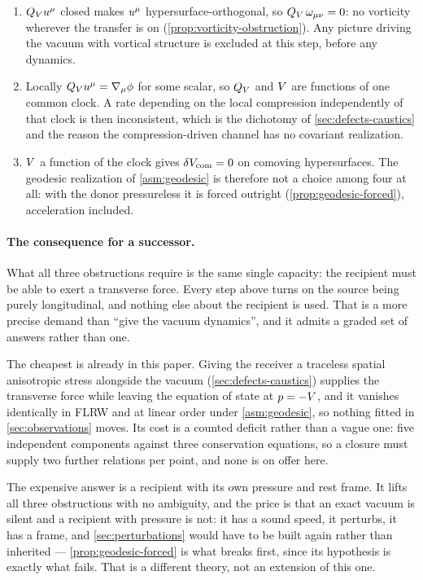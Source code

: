 \begin{enumerate}
  \item $Q_{V}u^{\mu}$ closed makes $u^{\mu}$ hypersurface-orthogonal, so
    $Q_{V}\,\omega_{\mu\nu}=0$: no vorticity wherever the transfer is on
    (\cref{prop:vorticity-obstruction}). Any picture driving the vacuum with
    vortical structure is excluded at this step, before any dynamics.
  \item Locally $Q_{V}u^{\mu}=\nabla_\mu\phi$ for some scalar, so $Q_{V}$ and $V$
    are functions of one common clock. A rate depending on the local
    compression independently of that clock is then inconsistent, which is the
    dichotomy of \cref{sec:defects-caustics} and the reason the
    compression-driven channel has no covariant realization.
  \item $V$ a function of the clock gives $\delta V_{\rm com}=0$ on
    comoving hypersurfaces. The geodesic realization of \cref{asm:geodesic} is
    therefore not a choice among four at all: with the donor pressureless it is
    forced outright (\cref{prop:geodesic-forced}), acceleration included.
\end{enumerate}

\paragraph{The consequence for a successor.} What all three obstructions
require is the same single capacity: the recipient must be able to exert a
transverse force. Every step above turns on the source being purely
longitudinal, and nothing else about the recipient is used. That is a more
precise demand than ``give the vacuum dynamics'', and it admits a graded set of
answers rather than one.

The cheapest is already in this paper. Giving the receiver a traceless spatial
anisotropic stress alongside the vacuum (\cref{sec:defects-caustics}) supplies
the transverse force while leaving the equation of state at $p=-V$, and it
vanishes identically in FLRW and at linear order under \cref{asm:geodesic},
so nothing fitted in \cref{sec:observations} moves. Its cost is a counted deficit rather than a vague one: five independent
components against three conservation equations, so a closure must supply two
further relations per point, and none is on offer here.

The expensive answer is a recipient with its own pressure and rest frame. It
lifts all three obstructions with no ambiguity, and the price is that an exact
vacuum is silent and a recipient with pressure is not: it has a sound speed, it
perturbs, it has a frame, and \cref{sec:perturbations} would have to be built
again rather than inherited --- \cref{prop:geodesic-forced} is what breaks
first, since its hypothesis is exactly what fails. That is a different theory,
not an extension of this one.

